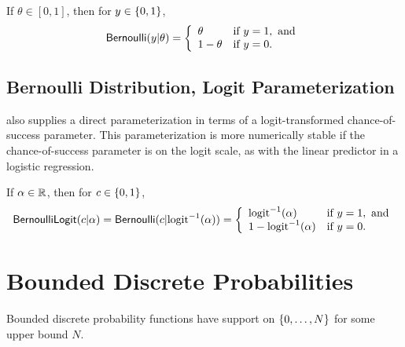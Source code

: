 If $\theta \in [0,1]$, then for $y \in \{ 0,1 \}$, 
\[
\mbox{\sf Bernoulli}(y|\theta)
=
\left\{
\begin{array}{ll}
\theta & \mbox{if } y = 1, \mbox{ and}
\\
1 - \theta & \mbox{if } y = 0.
\end{array}
\right.
\]
\begin{description}
%
%
\end{description}

\begin{description}
%
%
\end{description}

\subsection{Bernoulli Distribution, Logit Parameterization}

\Stan also supplies a direct parameterization in terms of a
logit-transformed chance-of-success parameter.  This parameterization
is more numerically stable if the chance-of-success parameter is on
the logit scale, as with the linear predictor in a logistic
regression.  

If $\alpha \in \mathbb{R}$, then for $c \in \{ 0,1 \}$,
\[
\mbox{\sf BernoulliLogit}(c|\alpha)
=
\mbox{\sf Bernoulli}(c|\mbox{logit}^{-1}(\alpha))
= 
\left\{
\begin{array}{ll}
\mbox{logit}^{-1}(\alpha) & \mbox{if } y = 1, \mbox{ and}
\\
1 - \mbox{logit}^{-1}(\alpha) & \mbox{if } y = 0.
\end{array}
\right.
\]
\begin{description}
%
%
\end{description}

\section{Bounded Discrete Probabilities}\label{betafun.section}

Bounded discrete probability functions have support on
$\{ 0,\ldots,N \}$ for some upper bound $N$.

